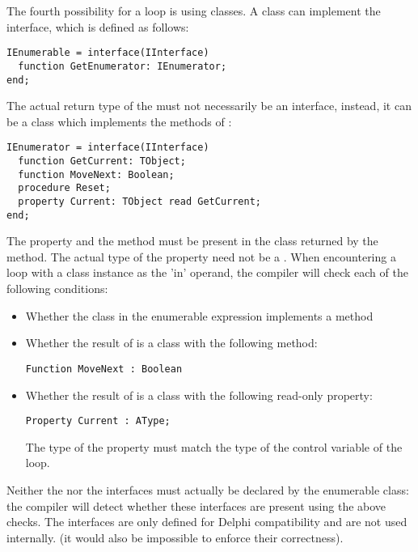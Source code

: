 The fourth possibility for a  loop is using classes. A class can implement the
 interface, which is defined as
follows:
\begin{verbatim}
IEnumerable = interface(IInterface)
  function GetEnumerator: IEnumerator;
end;
\end{verbatim}
The actual return type of the  must not necessarily be an
 interface, instead, it can be a class which implements the methods
of :
\begin{verbatim}
IEnumerator = interface(IInterface)
  function GetCurrent: TObject;
  function MoveNext: Boolean;
  procedure Reset;
  property Current: TObject read GetCurrent;
end;
\end{verbatim}
The  property and the  method must be present in
the class returned by the  method. The actual type of the
 property need not be a . When encountering a
 loop with a class instance as the 'in' operand, the compiler will 
check each of the following conditions:
\begin{itemize}
\item Whether the class in the enumerable expression implements a method
\item Whether the result of  is a class with the
following method:
\begin{verbatim}
Function MoveNext : Boolean
\end{verbatim}
\item Whether the result of  is a class with the
following read-only property:
\begin{verbatim}
Property Current : AType;
\end{verbatim}
The type of the property must match the type of the control variable of the
 loop.
\end{itemize}
Neither the  nor the  interfaces must
actually be declared by the enumerable class: the compiler will detect
whether these interfaces are present using the above checks. The interfaces
are only defined for Delphi compatibility and are not used internally.
(it would also be impossible to enforce their correctness).

